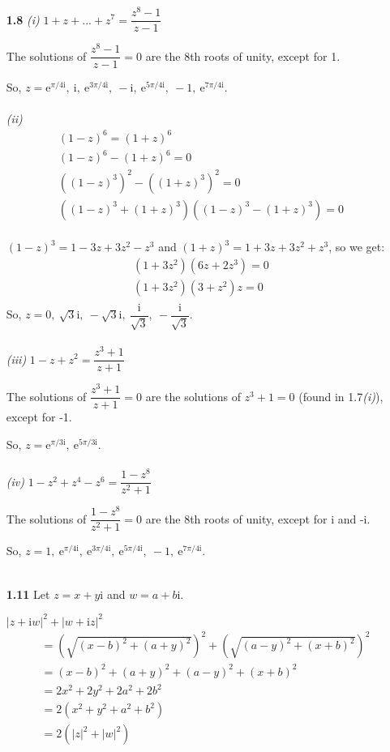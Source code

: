 \begin{enumerate}
\item[\textbf{1.8}] 
\textit{(i)}
$1+z+...+z^7 = \dfrac{z^8-1}{z-1}$

The solutions of $\dfrac{z^8-1}{z-1} = 0$ are the 8th roots of unity, except for 1. 

So, $z = \mathrm{e}^{\pi/4\mathrm{i}}, \:
\mathrm{i},\:
\mathrm{e}^{3\pi/4\mathrm{i}},\:
-\mathrm{i},\:
\mathrm{e}^{5\pi/4\mathrm{i}},\:
-1, \:
\mathrm{e}^{7\pi/4\mathrm{i}}
$.
\\\\
\textit{(ii)}
\begin{gather*}
  (1-z)^6 = (1+z)^6 \\
  (1-z)^6 - (1+z)^6 = 0 \\
  ((1-z)^3)^2 - ((1+z)^3)^2 = 0 \\
  ((1-z)^3 + (1+z)^3)((1-z)^3 - (1+z)^3) = 0 
\end{gather*}
\\
$(1-z)^3 = 1 - 3z + 3z^2 - z^3$ and 
$(1+z)^3 = 1 + 3z + 3z^2 + z^3$, so we get:
\begin{gather*}
  (1+3z^2)(6z+2z^3) = 0 \\
  (1+3z^2)(3+z^2)z = 0 \\
\end{gather*}
So, $z=0, \:
\sqrt{3}\mathrm{i},  \:
-\sqrt{3}\mathrm{i}, \:
\dfrac{\mathrm{i}}{\sqrt{3}}, \:
-\dfrac{\mathrm{i}}{\sqrt{3}}
$.
\\\\
\textit{(iii)}
$1-z+z^2 = \dfrac{z^3+1}{z+1}$

The solutions of $\dfrac{z^3+1}{z+1} = 0$ are the solutions of $z^3+1 = 0$ (found in 1.7\textit{(i)}), except for -1. 

So, $z = \mathrm{e}^{\pi/3\mathrm{i}}, \:
\mathrm{e}^{5\pi/3\mathrm{i}}
$.
\\\\
\textit{(iv)}
$1-z^2+z^4-z^6 = \dfrac{1-z^8}{z^2+1}$

The solutions of $\dfrac{1-z^8}{z^2+1} = 0$ are the 8th roots of unity, except for i and -i. 

So, $z = 1, \:
\mathrm{e}^{\pi/4\mathrm{i}}, \:
\mathrm{e}^{3\pi/4\mathrm{i}},\:
\mathrm{e}^{5\pi/4\mathrm{i}},\:
-1, \:
\mathrm{e}^{7\pi/4\mathrm{i}}
$.
\\\\
\item[\textbf{1.11}]
Let $z = x+y\mathrm{i}$ and $w = a+b\mathrm{i}$.

$|z+\mathrm{i}w|^2+|w+\mathrm{i}z|^2$
\begin{align*}
  &=(\sqrt{(x-b)^2 + (a+y)^2})^2 + 
  (\sqrt{(a-y)^2 + (x+b)^2})^2 \\
  &=(x-b)^2 + (a+y)^2 + (a-y)^2 + (x+b)^2 \\  
  &= 2x^2 + 2y^2 + 2a^2 + 2b^2 \\
  &= 2(x^2 + y^2 + a^2 + b^2) \\
  &= 2(|z|^2 + |w|^2)
\end{align*}


\end{enumerate}
